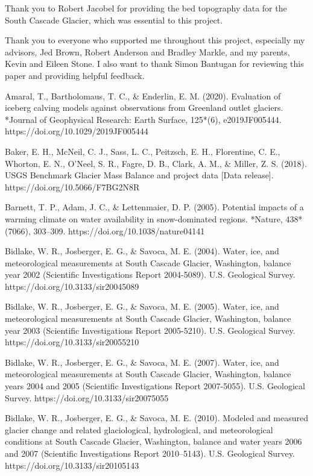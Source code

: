\documentclass{article}
\begin{document}
Thank you to Robert Jacobel for providing the bed topography data for the South Cascade Glacier, which was essential to this project.

Thank you to everyone who supported me throughout this project, especially my advisors, Jed Brown, Robert Anderson and Bradley Markle, and my parents, Kevin 
and Eileen Stone. I also want to thank Simon Bantugan for reviewing this paper and providing helpful feedback.
\begin{thebibliography}{}

    Amaral, T., Bartholomaus, T. C., \& Enderlin, E. M. (2020). Evaluation of iceberg calving models against observations from Greenland outlet glaciers. *Journal of Geophysical Research: Earth Surface, 125*(6), e2019JF005444. https://doi.org/10.1029/2019JF005444

    Baker, E. H., McNeil, C. J., Sass, L. C., Peitzsch, E. H., Florentine, C. E., Whorton, E. N., O’Neel, S. R., Fagre, D. B., Clark, A. M., \& Miller, Z. S. (2018). USGS Benchmark Glacier Mass Balance and project data [Data release]. https://doi.org/10.5066/F7BG2N8R

    Barnett, T. P., Adam, J. C., \& Lettenmaier, D. P. (2005). Potential impacts of a warming climate on water availability in snow-dominated regions. *Nature, 438*(7066), 303–309. https://doi.org/10.1038/nature04141

    Bidlake, W. R., Josberger, E. G., \& Savoca, M. E. (2004). Water, ice, and meteorological measurements at South Cascade Glacier, Washington, balance year 2002 (Scientific Investigations Report 2004-5089). U.S. Geological Survey. https://doi.org/10.3133/sir20045089
    
    Bidlake, W. R., Josberger, E. G., \& Savoca, M. E. (2005). Water, ice, and meteorological measurements at South Cascade Glacier, Washington, balance year 2003 (Scientific Investigations Report 2005-5210). U.S. Geological Survey. https://doi.org/10.3133/sir20055210

    Bidlake, W. R., Josberger, E. G., \& Savoca, M. E. (2007). Water, ice, and meteorological measurements at South Cascade Glacier, Washington, balance years 2004 and 2005 (Scientific Investigations Report 2007-5055). U.S. Geological Survey. https://doi.org/10.3133/sir20075055

    Bidlake, W. R., Josberger, E. G., \& Savoca, M. E. (2010). Modeled and measured glacier change and related glaciological, hydrological, and meteorological conditions at South Cascade Glacier, Washington, balance and water years 2006 and 2007 (Scientific Investigations Report 2010–5143). U.S. Geological Survey. https://doi.org/10.3133/sir20105143


\end{thebibliography}
\end{document}
